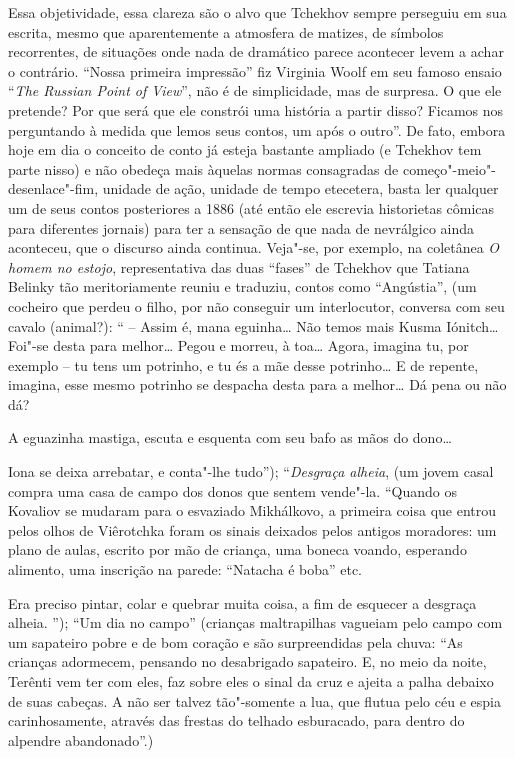 Essa objetividade, essa clareza são o alvo que Tchekhov sempre perseguiu
em sua escrita, mesmo que aparentemente a atmosfera de matizes, de
símbolos recorrentes, de situações onde nada de dramático parece
acontecer levem a achar o contrário. ``Nossa primeira impressão'' fiz
Virginia Woolf em seu famoso ensaio ``\emph{The Russian Point of
View}'', não é de simplicidade, mas de surpresa. O que ele pretende? Por
que será que ele constrói uma história a partir disso? Ficamos nos
perguntando à medida que lemos seus contos, um após o outro''. De fato,
embora hoje em dia o conceito de conto já esteja bastante ampliado (e
Tchekhov tem parte nisso) e não obedeça mais àquelas normas consagradas
de começo"-meio"-desenlace"-fim, unidade de ação, unidade de tempo
etecetera, basta ler qualquer um de seus contos posteriores a 1886 (até
então ele escrevia historietas cômicas para diferentes jornais) para ter
a sensação de que nada de nevrálgico ainda aconteceu, que o discurso
ainda continua. Veja"-se, por exemplo, na coletânea \emph{O homem no
estojo}, representativa das duas ``fases'' de Tchekhov que Tatiana
Belinky tão meritoriamente reuniu e traduziu, contos como ``Angústia'',
(um cocheiro que perdeu o filho, por não conseguir um interlocutor,
conversa com seu cavalo (animal?): `` -- Assim é, mana eguinha\ldots{} Não
temos mais Kusma Iónitch\ldots{} Foi"-se desta para melhor\ldots{} Pegou e morreu,
à toa\ldots{} Agora, imagina tu, por exemplo -- tu tens um potrinho, e tu és
a mãe desse potrinho\ldots{} E de repente, imagina, esse mesmo potrinho se
despacha desta para a melhor\ldots{} Dá pena ou não dá?

A eguazinha mastiga, escuta e esquenta com seu bafo as mãos do dono\ldots{}

Iona se deixa arrebatar, e conta"-lhe tudo''); ``\emph{Desgraça alheia},
(um jovem casal compra uma casa de campo dos donos que sentem vende"-la.
``Quando os Kovaliov se mudaram para o esvaziado Mikhálkovo, a primeira
coisa que entrou pelos olhos de Viêrotchka foram os sinais deixados
pelos antigos moradores: um plano de aulas, escrito por mão de criança,
uma boneca voando, esperando alimento, uma inscrição na parede:
``Natacha é boba'' etc.

Era preciso pintar, colar e quebrar muita coisa, a fim de esquecer a
desgraça alheia. ''); ``Um dia no campo'' (crianças maltrapilhas
vagueiam pelo campo com um sapateiro pobre e de bom coração e são
surpreendidas pela chuva: ``As crianças adormecem, pensando no
desabrigado sapateiro. E, no meio da noite, Terênti vem ter com eles,
faz sobre eles o sinal da cruz e ajeita a palha debaixo de suas cabeças.
A não ser talvez tão"-somente a lua, que flutua pelo céu e espia
carinhosamente, através das frestas do telhado esburacado, para dentro
do alpendre abandonado''.)

